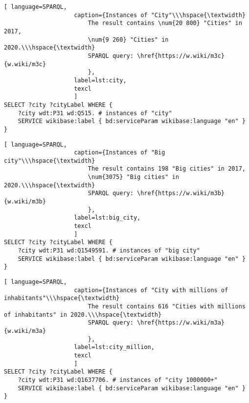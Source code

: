 \begin{lstlisting}[ language=SPARQL, 
                    caption={Instances of "City"\\\hspace{\textwidth}
                        The result contains \num{20 800} "Cities" in 2017, 
                        \num{9 260} "Cities" in 2020.\\\hspace{\textwidth}
                        SPARQL query: \href{https://w.wiki/m3c}{w.wiki/m3c}
                        },
                    label=lst:city,
                    texcl 
                    ]
SELECT ?city ?cityLabel WHERE {
	?city wdt:P31 wd:Q515. # instances of "city"
	SERVICE wikibase:label { bd:serviceParam wikibase:language "en" }
}
\end{lstlisting}%

\begin{lstlisting}[ language=SPARQL, 
                    caption={Instances of "Big city"\\\hspace{\textwidth}
                        The result contains 198 "Big cities" in 2017, 
                        \num{3075} "Big cities" in 2020.\\\hspace{\textwidth}
                        SPARQL query: \href{https://w.wiki/m3b}{w.wiki/m3b}
                        },
                    label=lst:big_city,
                    texcl 
                    ]
SELECT ?city ?cityLabel WHERE {
	?city wdt:P31 wd:Q1549591. # instances of "big city"    
	SERVICE wikibase:label { bd:serviceParam wikibase:language "en" }
}
\end{lstlisting}%

\begin{lstlisting}[ language=SPARQL, 
                    caption={Instances of "City with millions of inhabitants"\\\hspace{\textwidth}
                        The result contains 616 "Cities with millions of inhabitants" in 2020.\\\hspace{\textwidth}
                        SPARQL query: \href{https://w.wiki/m3a}{w.wiki/m3a}
                        },
                    label=lst:city_million,
                    texcl 
                    ]
SELECT ?city ?cityLabel WHERE {
	?city wdt:P31 wd:Q1637706. # instances of "city 1000000+" 
	SERVICE wikibase:label { bd:serviceParam wikibase:language "en" }
}
\end{lstlisting}%

